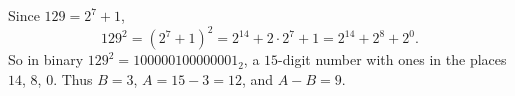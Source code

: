 Since $129=2^7+1$,
\[
129^2=(2^7+1)^2=2^{14}+2\cdot2^7+1=2^{14}+2^8+2^0 .
\]
So in binary $129^2=100000100000001_2$, a $15$-digit number with ones in the places $14$, $8$, $0$. Thus $B=3$, $A=15-3=12$, and $A-B=\boxed{9}$.
